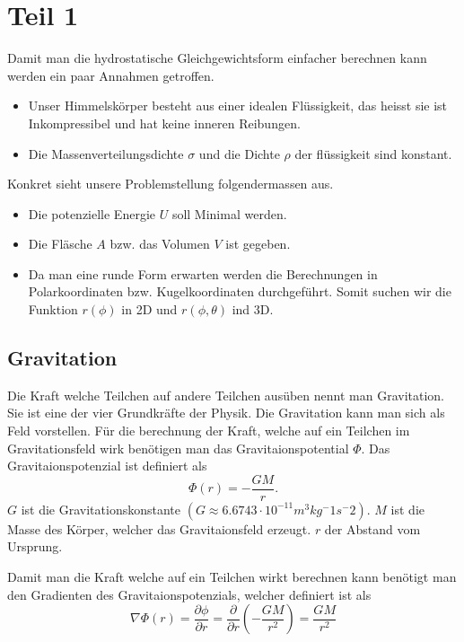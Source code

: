 %
%
%
%
\section{Teil 1
\label{planet:section:teil1}}
Damit man die hydrostatische Gleichgewichtsform einfacher berechnen kann werden ein paar Annahmen getroffen.
\begin{itemize}
	\item Unser Himmelskörper besteht aus einer idealen Flüssigkeit, das heisst sie ist Inkompressibel und hat keine inneren Reibungen.
	\item Die Massenverteilungsdichte \(\sigma\) und die Dichte \(\rho\) der flüssigkeit sind konstant.	
\end{itemize}

Konkret sieht unsere Problemstellung folgendermassen aus.
\begin{itemize}
	\item Die potenzielle Energie \(U\) soll Minimal werden.
	\item Die Fläsche \(A\) bzw. das Volumen \(V\) ist gegeben.
	\item Da man eine runde Form erwarten werden die Berechnungen in Polarkoordinaten bzw. Kugelkoordinaten durchgeführt. Somit suchen wir die Funktion \(r(\phi)\) in 2D und \(r(\phi,\theta)\) ind 3D.
\end{itemize}

\subsection{Gravitation}

Die Kraft welche Teilchen auf andere Teilchen ausüben nennt man Gravitation.
Sie ist eine der vier Grundkräfte der Physik.
Die Gravitation kann man sich als Feld vorstellen.
Für die berechnung der Kraft, welche auf ein Teilchen im Gravitationsfeld wirk benötigen man das Gravitaionspotential \(\Phi\).
Das Gravitaionspotenzial ist definiert als
\begin{equation}
	\Phi(r) = -\frac{GM}{r}.
	\label{planet:equ:gravpot}
\end{equation}
\(G\) ist die Gravitationskonstante \((G \approx 6.6743 \cdot 10^{-11} m^3 kg^-1 s^-2)\).
\(M\) ist die Masse des Körper, welcher das Gravitaionsfeld erzeugt.
\(r\) der Abstand vom Ursprung.

Damit man die Kraft welche auf ein Teilchen wirkt berechnen kann benötigt man den Gradienten des Gravitaionspotenzials, welcher definiert ist als
\begin{equation}
	\nabla \Phi (r) = \frac{\partial \phi}{\partial r} = \frac{\partial}{\partial r} (-\frac{GM}{r^2}) = \frac{GM}{r^2}
\end{equation}

